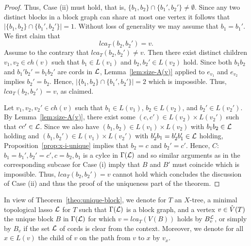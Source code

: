 \begin{proof}
Thus, Case (ii) must hold, that is,  
$\{b_1,b_2\}\cap\{b_1',b_2'\}\not=\emptyset $. Since any 
two distinct blocks in a block graph can share at most one vertex 
it follows that $|\{b_1,b_2\}\cap\{b_1',b_2'\}|=1$.
Without loss of generality we may assume that $b_1=b_1'$. 
We first claim that 
$$
lca_T(b_2,b_2')=v.
$$
Assume to the contrary that $lca_T(b_2,b_2')\not=v$. 
Then there exist distinct children $v_1,v_2 \in ch(v)$ 
such that $b_1\in L(v_1)$ and $b_2,b_2'\in L(v_2)$ hold. 
Since both $b_1b_2$ and
$b_1'b_2'=b_1b_2'$ are cords in ${\mathcal L}$, Lemma~\ref{lem:size-A(v)}
applied to 
$e_{v_1}$ and $e_{v_2}$
implies $b_2'=b_2$. Hence, $|\{b_1,b_2\}\cap\{b_1',b_2'\}|=2$ which 
is impossible. Thus, $lca_T(b_2,b_2')=v$, as claimed.

Let $v_1,v_2,v_2'\in ch(v)$  such that
$b_1\in L(v_1)$, $b_2\in L(v_2)$, and $b_2'\in L(v_2')$. 
By Lemma~\ref{lem:size-A(v)}, there exist some
$(c,c')\in L(v_2)\times L(v_2')$ such that $cc'\in {\mathcal L}$.
Since we also have $(b_1,b_2)\in L(v_1)\times L(v_2)$ with
$b_1b_2\in {\mathcal L}$ holding and $(b_1,b_2')\in L(v_1)\times L(v_2')$ with
$b_2'b_1=b_2'b_1'\in {\mathcal L}$ holding, Proposition~\ref{prop:x-i-unique}
implies that $b_2=c$ and $b_2'=c'$. Hence, $C$: $b_1=b_1',b_2'=c',
c=b_2,b_1$ is a cylce in $\Gamma({\mathcal L})$ and so similar arguments
as in the corresponding subcase for Case (i) imply that 
%
%
$B$ and $B'$ must coincide which is impossible. Thus, 
$lca_T(b_2,b_2')=v$ cannot hold  which concludes the discussion
of Case (ii) and thus the proof of the uniqueness part of the theorem.
\qquad \end{proof}

In view of Theorem~\ref{theo:unique-block}, we denote for $T$ an $X$-tree,
 a minimal topological lasso ${\mathcal L}$ for $T$ such that $\Gamma({\mathcal L})$
is a block graph, and a vertex $v\in \mathring{V}(T)$ 
the unique block $B$ in $\Gamma({\mathcal L})$ for which 
$v=lca_T(V(B))$ holds by 
$B_v^{{\mathcal L}}$, or simply by
$B_v$ if the set ${\mathcal L}$ of cords is clear from the context. 
Moreover, we denote for all 
$x\in L(v)$ the child of $v$ on the path from  $v$ to $x$ by $v_x$. 

